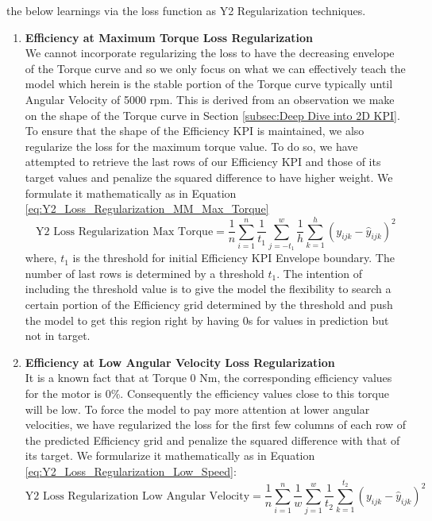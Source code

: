 \documentclass{report} %
\begin{document}
\begin{enumerate}
the below learnings via the loss function as Y2 Regularization techniques.
\begin{enumerate}
\item \textbf{Efficiency at Maximum Torque Loss Regularization} \\
We cannot incorporate regularizing the loss to have the decreasing envelope of the Torque curve and so we only focus on what we can effectively teach the model which 
herein is the stable portion of the Torque curve typically until Angular Velocity of 5000 rpm. This is derived from an observation we make on the shape of the Torque 
curve in Section \ref{subsec:Deep Dive into 2D KPI}.
To ensure that the shape of the Efficiency \ac{KPI} is maintained, we also regularize the loss for the maximum torque value.
To do so, we have attempted to retrieve the last rows of our Efficiency \ac{KPI} and those of its target values and penalize the squared difference to have higher weight.
We formulate it mathematically as in Equation \ref{eq:Y2_Loss_Regularization_MM_Max_Torque}
\begin{equation}
    \text{Y2 Loss Regularization Max Torque} = \frac{1}{n} \sum_{i=1}^{n} \frac{1}{t_{1}} \sum_{j=-t_{1}}^{w} \frac{1}{h} \sum_{k=1}^{h} (y_{ijk} - \hat{y}_{ijk})^2
    \label{eq:Y2_Loss_Regularization_MM_Max_Torque}
\end{equation}
where, \(t_{1}\) is the threshold for initial Efficiency \ac{KPI} Envelope boundary. The number of last rows is determined by a threshold $t_{1}$.
The intention of including the threshold value is to give the model the flexibility to search a certain portion of the Efficiency grid determined by the threshold and 
push the model to get this region right by having 0s for values in prediction but not in target.
\item \textbf{Efficiency at Low Angular Velocity Loss Regularization} \\
It is a known fact that at Torque 0 Nm, the corresponding efficiency values for the motor is 0\%. Consequently the efficiency values close to this torque will be low.
To force the model to pay more attention at lower angular velocities, we have regularized the loss for the first few columns of each row of the predicted Efficiency grid 
and penalize the squared difference with that of its target. We formularize it mathematically as in Equation \ref{eq:Y2_Loss_Regularization_Low_Speed}:
\begin{equation}
    \text{Y2 Loss Regularization Low Angular Velocity} = \frac{1}{n} \sum_{i=1}^{n} \frac{1}{w} \sum_{j=1}^{w} \frac{1}{t_{2}} \sum_{k=1}^{t_{2}} (y_{ijk} - \hat{y}_{ijk})^2

\end{equation}
\end{enumerate}
\end{enumerate}
\end{document}

